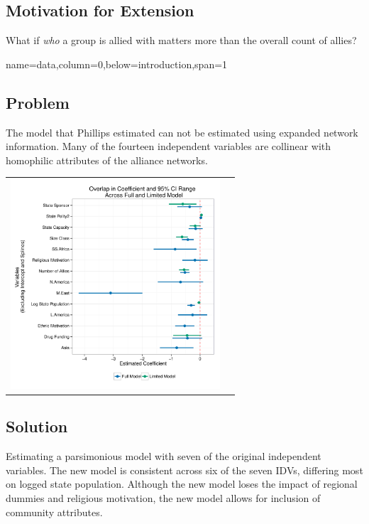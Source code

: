 \documentclass[landscape,paperheight=24in,fontscale=.45,paperwidth=36in,landscape,final]{baposter}
\begin{document}
\begin{poster}
{\subsection*{Motivation for Extension}
What if \textit{who} a
  group is allied with matters more than the overall count of
allies?
\vspace{2mm}
}

%
%
{name=data,column=0,below=introduction,span=1}
{

\subsection*{Problem}
The model that Phillips estimated can not be estimated
using expanded network information. Many of the fourteen
independent variables are collinear with homophilic attributes of the
alliance networks. 
\vspace{-9mm}
\begin{center}
\begin{tabular}{cl}
 \\ [2.0ex]
\includegraphics[width=78mm]{CoefPlotsBothModels.pdf}\\

\end{tabular}
\end{center}
\vspace{-17mm} 
\subsection*{Solution}
Estimating a parsimonious model with seven of the original independent
variables. The new model is consistent across six of the seven
IDVs, differing most on logged state population. Although the new model loses the impact of regional
dummies and religious motivation, the new model allows for inclusion of
community attributes.
}



\end{poster}
\end{document}
